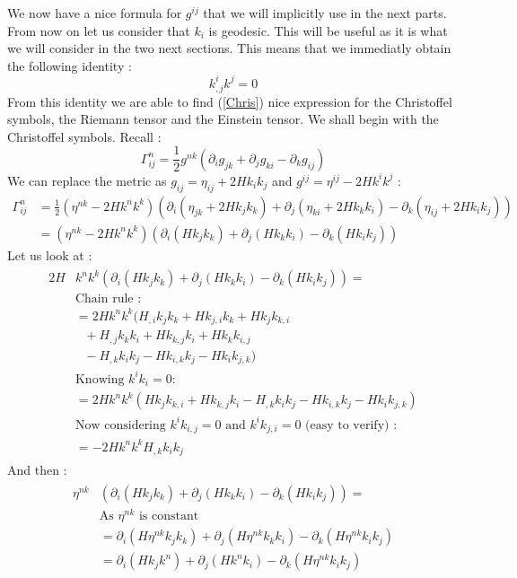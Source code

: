 \documentclass[a4paper,12pt]{article}
\theoremstyle{definition}
\begin{document}
We now have a nice formula for $g^{ij}$ that we will implicitly use in the next parts.
From now on let us consider that $k_i$ is geodesic. This will be useful as it is what we will consider in the two next sections.
This means that we immediatly obtain the following identity :
\begin{equation}
	k^i_{,j}k^j=0
\end{equation}
From this identity we are able to find (\ref{Chris}) nice expression for the Christoffel symbols, the Riemann tensor and the Einstein tensor.
We shall begin with the Christoffel symbols.
Recall :
\begin{equation}
	\Gamma^n_{ij}=\frac{1}{2}g^{nk}(\partial_i g_{jk}+\partial_j g_{ki}-\partial_k g_{ij})
\end{equation}
We can replace the metric as $g_{ij}=\eta_{ij}+2Hk_ik_j$ and $g^{ij}=\eta^{ij}-2Hk^ik^j$ :
\begin{align}
	\Gamma^n_{ij}&=\frac{1}{2}(\eta^{nk}-2Hk^nk^k)(\partial_i (\eta_{jk}+2Hk_jk_k)+\partial_j (\eta_{ki}+2Hk_kk_i)-\partial_k (\eta_{ij}+2Hk_ik_j))\\
	&=(\eta^{nk}-2Hk^nk^k)(\partial_i (Hk_jk_k)+\partial_j (Hk_kk_i)-\partial_k (Hk_ik_j))
\end{align}
Let us look at :
\begin{align}
\begin{split}
	2H&k^nk^k(\partial_i (Hk_jk_k)+\partial_j (Hk_kk_i)-\partial_k (Hk_ik_j)) =\\
	&\text{Chain rule :}\\
	&=2Hk^nk^k(H_{,i}k_jk_k+Hk_{j,i}k_k+Hk_jk_{k,i}\\&\text{ }+H_{,j}k_kk_i+Hk_{k,j}k_i+Hk_kk_{i,j}\\&\text{ }-H_{,k}k_ik_j-Hk_{i,k}k_j-Hk_ik_{j,k})\\
	&\text{Knowing } k^ik_i=0 :\\
	&=2Hk^nk^k(Hk_jk_{k,i}+Hk_{k,j}k_i-H_{,k}k_ik_j-Hk_{i,k}k_j-Hk_ik_{j,k})\\
	&\text{Now considering $k^ik_{i,j}=0$ and $k^ik_{j,i}=0$ (easy to verify) :}\\
	&=-2Hk^nk^kH_{,k}k_ik_j
\end{split}
\end{align}
And then :
\begin{align}
\begin{split}
	\eta^{nk}&(\partial_i (Hk_jk_k)+\partial_j (Hk_kk_i)-\partial_k (Hk_ik_j))=\\
	&\text{As $\eta^{nk}$ is constant}\\
	&=\partial_i (H\eta^{nk}k_jk_k)+\partial_j (H\eta^{nk}k_kk_i)-\partial_k (H\eta^{nk}k_ik_j)\\
	&=\partial_i (Hk_jk^n)+\partial_j (Hk^nk_i)-\partial_k (H\eta^{nk}k_ik_j)
\end{split}
\end{align}
\end{document}
